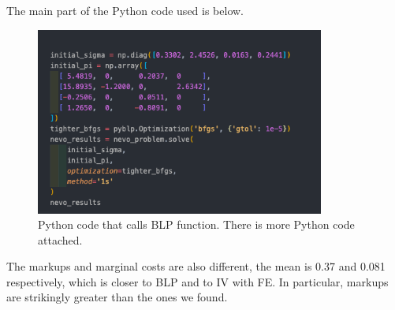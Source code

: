 \documentclass{article}
\theoremstyle{definition}
\begin{document}
The main part of the Python code used is below.

\begin{figure}[h]
\centering
\includegraphics[width=9.5cm]{imgs/python_code.png}
\caption{Python code that calls BLP function. There is more Python code attached. }
\end{figure}

The markups and marginal costs are also different, the mean is 0.37 and 0.081 respectively, which is closer to BLP and to IV with FE. In particular, markups are strikingly greater than the ones we found.
\end{document}
